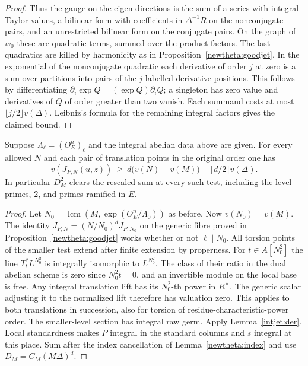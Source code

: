 \begin{proof}
Thus the gauge on the eigen-directions is the sum of a series with
integral Taylor values, a bilinear form with coefficients in
\(\Delta^{-1}R\) on the nonconjugate pairs, and an unrestricted
bilinear form on the conjugate pairs. On the graph of \(w_0\) these
are quadratic terms, summed over the product factors. The last
quadratics are killed by harmonicity as in
Proposition~\ref{newtheta:goodjet}. In the exponential of the
nonconjugate quadratic each derivative of order \(j\) at zero is
a sum over partitions into pairs of the \(j\) labelled derivative
positions. This follows by differentiating \(\partial_i\exp
Q=(\exp Q)\partial_i Q\); a singleton has zero value and derivatives
of \(Q\) of order greater than two vanish. Each summand costs at
most \(\lfloor j/2\rfloor v(\Delta)\). Leibniz's formula for the
remaining integral factors gives the claimed bound.
\end{proof}

\begin{proposition}
\label{intjet:standard}
Suppose \(\Lambda_\ell=(O_E^n)_\ell\) and the integral abelian data
above are given. For every allowed \(N\) and each pair of translation
points in the original order one has
\[
 v(J_{P,N}(u,z))\ \ge\
 d\bigl(v(N)-v(M)\bigr)-\lfloor d/2\rfloor v(\Delta).
\]
In particular \(D_M^2\) clears the rescaled sum at every such test,
including the level primes, \(2\), and primes ramified in \(E\).
\end{proposition}
\begin{proof}
Let \(N_0=\operatorname{lcm}(M,\exp(O_E^n/\Lambda_0))\) as before.
Now \(v(N_0)=v(M)\). The identity
\(J_{P,N}= (N/N_0)^d J_{P,N_0}\) on the generic fibre proved in
Proposition~\ref{newtheta:goodjet} works whether or not \(\ell\mid N_0\).
All torsion points of the smaller test extend after finite extension
by properness. For \(t\in A[N_0^2]\) the line \(T_t^*L^{N_0^2}\)
is integrally isomorphic to \(L^{N_0^2}\). The class of their
ratio in the dual abelian scheme is zero since \(N_0^2t=0\),
and an invertible module on the local base is free. Any integral
translation lift has its \(N_0^2\)-th power in \(R^\times\).
The generic scalar adjusting it to the normalized lift therefore
has valuation zero. This applies to both translations in succession,
also for torsion of residue-characteristic-power order.
The smaller-level section has integral raw germ. Apply
Lemma~\ref{intjet:der}. Local standardness makes \(P\) integral in
the standard columns and \(s\) integral at this place. Sum after the
index cancellation of Lemma~\ref{newtheta:index} and use
\(D_M=C_M(M\Delta)^d\).
\end{proof}

